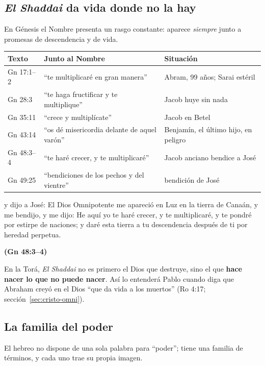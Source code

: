 \documentclass[11pt,letterpaper]{article}
\newcommand{\fuente}[1]{\par\hfill{\upshape\bfseries\small\textcolor{azul}{#1}}}
\newcommand{\destacar}[1]{\textbf{\textcolor{azul}{#1}}}
\begin{document}
\subsection{\emph{El Shaddai} da vida donde no la hay}

En Génesis el Nombre presenta un rasgo constante: aparece \emph{siempre} junto a promesas de descendencia y de vida.

\begin{center}\small\renewcommand{\arraystretch}{1.2}
\begin{tabular}{@{}L{2.4cm}L{7.4cm}L{4.6cm}@{}}
\toprule
\textbf{Texto} & \textbf{Junto al Nombre} & \textbf{Situación} \\ \midrule
Gn 17:1--2 & ``te multiplicaré en gran manera'' & Abram, 99 años; Sarai estéril \\
Gn 28:3 & ``te haga fructificar y te multiplique'' & Jacob huye sin nada \\
Gn 35:11 & ``crece y multiplícate'' & Jacob en Betel \\
Gn 43:14 & ``os dé misericordia delante de aquel varón'' & Benjamín, el último hijo, en peligro \\
Gn 48:3--4 & ``te haré crecer, y te multiplicaré'' & Jacob anciano bendice a José \\
Gn 49:25 & ``bendiciones de los pechos y del vientre'' & bendición de José \\
\bottomrule
\end{tabular}\end{center}

\begin{cita}y dijo a José: El Dios Omnipotente me apareció en Luz en la tierra de Canaán, y me bendijo, y me dijo: He aquí yo te haré crecer, y te multiplicaré, y te pondré por estirpe de naciones; y daré esta tierra a tu descendencia después de ti por heredad perpetua.\fuente{(Gn 48:3--4)}\end{cita}

En la Torá, \emph{El Shaddai} no es primero el Dios que destruye, sino el que \destacar{hace nacer lo que no puede nacer}. Así lo entenderá Pablo cuando diga que Abraham creyó en el Dios ``que da vida a los muertos'' (Ro 4:17; sección~\ref{sec:cristo-omni}).

\subsection{La familia del poder}

El hebreo no dispone de una sola palabra para ``poder''; tiene una familia de términos, y cada uno trae su propia imagen.
\end{document}
